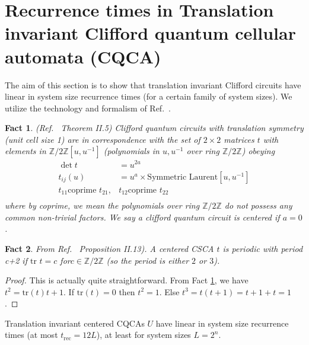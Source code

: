 \documentclass[aps,prb,twocolumn,superscriptaddress]{revtex4-1}
\newtheorem{fact}{Fact}[section]
\begin{document}
\section{Recurrence times in Translation invariant Clifford quantum cellular
automata (CQCA)}\label{app:linearrecurrence}
The aim of this section is to show that translation invariant Clifford circuits have linear in system size recurrence times (for a certain family of system sizes). We utilize the technology and formalism of Ref.~.
\begin{fact}
(Ref.~ Theorem II.5) Clifford quantum circuits with translation
symmetry (unit cell size 1) are in correspondence with the set of
$2\times2$ matrices $t$ with elements in $\mathbb{Z}/2\mathbb{Z}\left[u,u^{-1}\right]$
(polynomials in $u,u^{-1}$ over ring $\mathbb{Z}/2\mathbb{Z}$) obeying
\begin{align*}
\det t & =u^{2a}\\
t_{ij}(u) & =u^{a}\times\text{Symmetric Laurent}[u,u^{-1}]\\
t_{11}\text{coprime }t_{21}, & t_{12}\text{coprime }t_{22}\\
\end{align*}
where by coprime, we mean the polynomials over ring $\mathbb{Z}/2\mathbb{Z}$
do not possess any common non-trivial factors. We say a clifford quantum
circuit is centered if $a=0$. \label{fact:cliffordclassification}
\end{fact}
\begin{fact}
From Ref.~ Proposition II.13). A centered CSCA $t$ is periodic
with period c+2 if $\text{tr }t=c$ for$c\in\mathbb{Z}/2\mathbb{Z}$
(so the period is either $2$ or $3$). \label{fact:periodiccircuits}\end{fact}
\begin{proof}
This is actually quite straightforward. From Fact \ref{fact:cliffordclassification},
we have $t^{2}=\text{tr}\left(t\right)t+1$. If $\text{tr}(t)=0$
then $t^{2}=1$. Else $t^{3}=t(t+1)=t+1+t=1$. \end{proof}
\begin{theorem}
Translation invariant centered CQCAs $U$ have linear in system size
recurrence times (at most $t_{\text{rec}}=12L$), at least for system
sizes $L=2^{n}$.\end{theorem}
\end{document}
